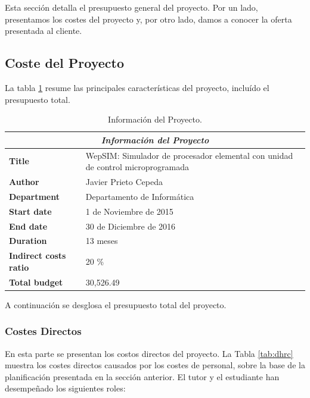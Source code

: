 Esta sección detalla el presupuesto general del proyecto. Por un lado, presentamos los costes del proyecto y, por otro lado, damos a conocer la oferta presentada al cliente.

\subsection{Coste del Proyecto}

La tabla \ref{tab:project_information} resume las principales características del proyecto, incluído el presupuesto total.

\begin{center}
\begin{table}[htbp]
\centering
\begin{tabular}{@{}p{3.5cm} p{9cm}@{}} 
\toprule
\multicolumn{2}{c}{\textbf{\textit{Información del Proyecto}}}\\
\midrule
\textbf{Title} 					& WepSIM: Simulador de procesador elemental con unidad de control microprogramada \\
\midrule
\textbf{Author} 					& Javier Prieto Cepeda \\
\midrule
\textbf{Department} 				& Departamento de Informática \\
\midrule
\textbf{Start date}				& 1 de Noviembre de 2015 \\
\midrule
\textbf{End date}				& 30 de Diciembre de 2016 \\
\midrule
\textbf{Duration} 				& 13 meses \\
\midrule
\textbf{Indirect costs ratio} 	& 20 \% \\
\midrule
\textbf{Total budget} 			& 30,526.49 \\
\bottomrule
\end{tabular}
\caption{Información del Proyecto.}
\label{tab:project_information}
\end{table}
\end{center}

A continuación se desglosa el presupuesto total del proyecto.

\subsubsection{Costes Directos}

En esta parte se presentan los costos directos del proyecto. La Tabla \ref{tab:dhrc} muestra los costes directos causados por los costes de personal, sobre la base de la planificación presentada en la sección anterior. El tutor y el estudiante han desempeñado los siguientes roles:

